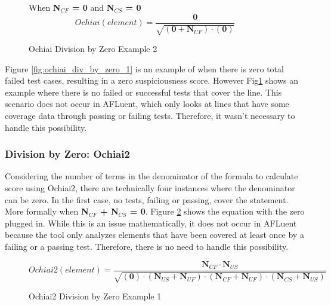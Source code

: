 \begin{figure}[!htb]
	\begin{center}
        When \textbf{N$_{CF}$ = 0} and \textbf{N$_{CS}$ = 0 }
		\begin{equation}
			Ochiai(element) = \frac{\textbf{0}}{\sqrt{(\textbf{0}  + \textbf{N$_{UF}$}) \cdot (\textbf{0})}}
		\end{equation}
		\caption{\label{fig:ochiai_div_by_zero_2} Ochiai Division by Zero Example 2}
	\end{center}
\end{figure}

Figure \ref{fig:ochiai_div_by_zero_1} is an example of when there is zero total
failed test cases, resulting in a zero suspiciousness score.
However Fig\ref{fig:ochiai_div_by_zero_2} shows an example where there is no
failed or successful tests that cover the line. This scenario does not
occur in AFLuent, which only looks at lines that have some coverage data through
passing or failing tests. Therefore, it wasn't necessary to handle this possibility.

\subsubsection{Division by Zero: Ochiai2}
\label{subsubsec:div_by_zero_ochiai2}

Considering the number of terms in the denominator of the formula to calculate
score using Ochiai2, there are technically four instances where the denominator
can be zero. In the first case, no tests, failing or passing, cover the
statement. More formally when \textbf{N$_{CF}$ + N$_{CS}$ = 0}.
Figure \ref{fig:ochiai2_div_by_zero_1} shows the equation with the zero plugged in.
While this is an issue mathematically, it does not occur in AFLuent because the
tool only analyzes elements that have been covered at least once by a failing or
a passing test. Therefore, there is no need to handle this possibility.

\begin{figure}[!htb]
	\begin{center}
		\begin{equation}
			Ochiai2(element) = \frac{\textbf{N$_{CF}$}\cdot{\textbf{N$_{US}$}}}{\sqrt{(\textbf{0}) \cdot (\textbf{N$_{US}$}  + \textbf{N$_{UF}$}) \cdot (\textbf{N$_{CF}$}  + \textbf{N$_{UF}$}) \cdot (\textbf{N$_{CS}$}  + \textbf{N$_{US}$})}}
		\end{equation}
		\caption{\label{fig:ochiai2_div_by_zero_1} Ochiai2 Division by Zero
		Example 1}
	\end{center}
\end{figure}

